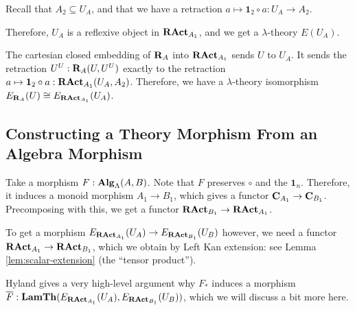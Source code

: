 \begin{definition}\label{def:lambda-algebra-to-lambda-theory}
  Recall that $ A_2 \subseteq U_A $, and that we have a retraction $ a \mapsto \mathbf 1_2 \circ a : U_A \to A_2 $.

  Therefore, $ U_A $ is a reflexive object in $ \mathbf{RAct}_{A_1} $, and we get a $ \lambda $-theory $ E(U_A) $.
\end{definition}

\begin{remark}
  The cartesian closed embedding of $ \mathbf{R}_A $ into $ \mathbf{RAct}_{A_1} $ sends $ U $ to $ U_A $. It sends the retraction $ U^U: \mathbf{R}_A(U, U^U) $ exactly to the retraction $ a \mapsto \mathbf 1_2 \circ a: \mathbf{RAct}_{A_1}(U_A, A_2) $. Therefore, we have a $ \lambda $-theory isomorphism $ E_{\mathbf{R}_A}(U) \cong E_{\mathbf{RAct}_{A_1}}(U_A) $.
\end{remark}

\subsection{Constructing a Theory Morphism From an Algebra Morphism}

Take a morphism $ F: \mathbf{Alg}_{\Lambda}(A, B) $. Note that $ F $ preserves $ \circ $ and the $ \mathbf 1_n $. Therefore, it induces a monoid morphism $ A_1 \to B_1 $, which gives a functor $ \mathbf{C}_{A_1} \to \mathbf{C}_{B_1} $. Precomposing with this, we get a functor $ \mathbf{RAct}_{B_1} \to \mathbf{RAct}_{A_1} $.

To get a morphism $ E_{\mathbf{RAct}_{A_1}}(U_A) \to E_{\mathbf{RAct}_{B_1}}(U_B) $ however, we need a functor $ \mathbf{RAct}_{A_1} \to \mathbf{RAct}_{B_1} $, which we obtain by Left Kan extension: see Lemma \ref{lem:scalar-extension} (the ``tensor product'').

Hyland gives a very high-level argument why $ F_* $ induces a morphism $ \overline F : \mathbf{LamTh}(E_{\mathbf{RAct}_{A_1}}(U_A), E_{\mathbf{RAct}_{B_1}}(U_B)) $, which we will discuss a bit more here.

